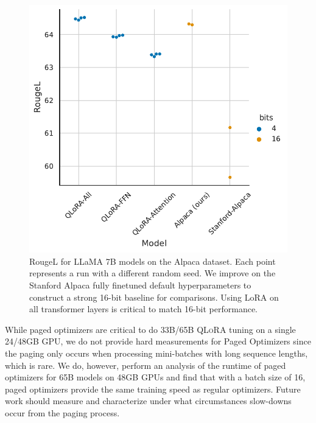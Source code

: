\documentclass{article}
\newcommand{\method}{\textsc{QLoRA}\xspace}
\begin{document}
\begin{figure}\vspace{-1em}
\centering
         \includegraphics[scale=0.42]{figures/hyper.pdf}
        \caption{
        RougeL for LLaMA 7B models on the Alpaca dataset. Each point represents a run with a different random seed. 
        We improve on the Stanford Alpaca fully finetuned default hyperparameters to construct a strong 16-bit baseline for comparisons. 
        Using LoRA on all transformer layers is critical to match 16-bit performance.  
        \vspace{-10pt}
        }
        \label{fig:hyper}
\end{figure}

While paged optimizers are critical to do 33B/65B \method tuning on a single 24/48GB GPU, we do not provide hard measurements for Paged Optimizers since the paging only occurs when processing mini-batches with long sequence lengths, which is rare. We do, however, perform an analysis of the runtime of paged optimizers for 65B models on 48GB GPUs and find that with a batch size of 16, paged optimizers provide the same training speed as regular optimizers. Future work should measure and characterize under what circumstances slow-downs occur from the paging process.

\end{document}
